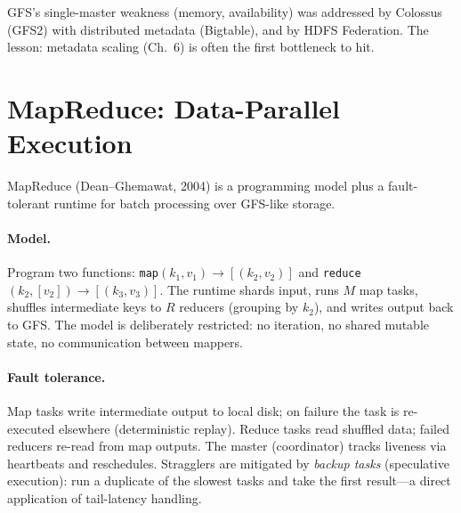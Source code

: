 GFS's single-master weakness (memory, availability) was addressed by Colossus (GFS2) with distributed metadata (Bigtable), and by HDFS Federation. The lesson: metadata scaling (Ch.~6) is often the first bottleneck to hit.

\section{MapReduce: Data-Parallel Execution}
\label{sec:mapreduce}
MapReduce (Dean--Ghemawat, 2004) is a programming model plus a fault-tolerant runtime for batch processing over GFS-like storage.

\paragraph{Model.} Program two functions: \texttt{map}$(k_1,v_1)\to[(k_2,v_2)]$ and \texttt{reduce}$(k_2,[v_2])\to[(k_3,v_3)]$. The runtime shards input, runs $M$ map tasks, shuffles intermediate keys to $R$ reducers (grouping by $k_2$), and writes output back to GFS. The model is deliberately restricted: no iteration, no shared mutable state, no communication between mappers.

\paragraph{Fault tolerance.} Map tasks write intermediate output to local disk; on failure the task is re-executed elsewhere (deterministic replay). Reduce tasks read shuffled data; failed reducers re-read from map outputs. The master (coordinator) tracks liveness via heartbeats and reschedules. Stragglers are mitigated by \emph{backup tasks} (speculative execution): run a duplicate of the slowest tasks and take the first result---a direct application of tail-latency handling.

